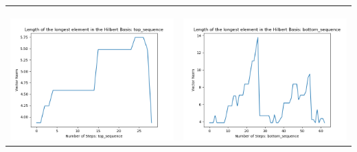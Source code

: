 \documentclass[10pt]{article}
\begin{document}
\begin{tabular}{c|c}
\begin{minipage}{.45\textwidth}
\end{minipage} \\ \\
\hline \\\begin{minipage}{.45\textwidth}
\includegraphics[width=\textwidth]{"DATA/4d/5 generators 2 bound F/top_sequence LENGTH"}
\end{minipage} &
\begin{minipage}{.45\textwidth}
\includegraphics[width=\textwidth]{"DATA/4d/5 generators 2 bound F bottomup/bottom_sequence LENGTH"}
\end{minipage}
\end{tabular}
\end{document}
